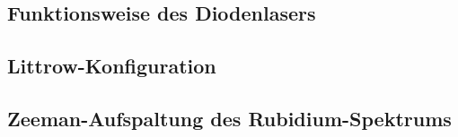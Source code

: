 \subsection{Funktionsweise des Diodenlasers}
\subsection{Littrow-Konfiguration}
\subsection{Zeeman-Aufspaltung des Rubidium-Spektrums}



